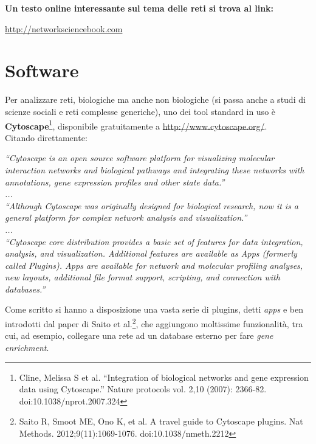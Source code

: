 \documentclass[a4paper,12pt, oneside]{book}
\begin{document}
\textbf{Un testo online interessante sul tema delle reti si trova al link:\\}
\begin{center}
  \url{http://networksciencebook.com}
\end{center}
\section{Software}
Per analizzare reti, biologiche ma anche non biologiche (si passa anche a studi
di scienze sociali e reti complesse generiche), uno dei tool standard
in uso è \textbf{Cytoscape}\footnote{Cline, Melissa S et al. “Integration of
  biological networks and gene expression data using Cytoscape.” Nature
  protocols vol. 2,10 (2007): 2366-82. doi:10.1038/nprot.2007.324}, disponibile
gratuitamente a 
\url{http://www.cytoscape.org/}.\\
Citando direttamente:
\begin{center}
  \textit{``Cytoscape is an open source software platform for visualizing
    molecular 
    interaction networks and biological pathways and integrating these networks
    with annotations, gene expression profiles and other state data.''\\
    ...\\
    ``Although Cytoscape was originally designed for biological research, now it
    is a 
    general platform for complex network analysis and visualization.''\\
    ...\\
    ``Cytoscape core distribution provides a basic set of features for data
    integration, 
    analysis, and visualization. Additional features are available as Apps
    (formerly called 
    Plugins). Apps are available for network and molecular profiling analyses,
    new layouts, additional file format support, scripting, and connection with
    databases.''  } 
\end{center}
Come scritto si hanno a disposizione una vasta serie di plugins, detti
\textit{apps} e ben introdotti dal paper di Saito et al.\footnote{Saito R, Smoot
ME, Ono K, et al. A travel guide to Cytoscape plugins. Nat
Methods. 2012;9(11):1069-1076. doi:10.1038/nmeth.2212}, che aggiungono
moltissime funzionalità, tra cui, ad esempio, 
collegare una rete ad un database esterno per fare \textit{gene enrichment}. 
\end{document}
